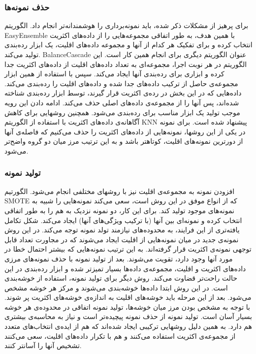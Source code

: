 \documentclass{article}
\begin{document}
\subsubsection{حذف نمونه‌ها}
برای پرهیز از مشکلات ذکر شده، باید نمونه‌برداری را هوشمندانه‌تر انجام داد. الگوریتم EasyEnsemble با همین هدف، به طور اتفاقی مجموعه‌هایی را از داده‌های اکثریت انتخاب کرده و برای تفکیک هر کدام از آنها و مجموعه داده‌های اقلیت، یک ابزار رده‌بندی تولید می‌کند. BalanceCascade عنوان الگوریتم دیگری برای انجام همین کار است. این الگوریتم در هر نوبت اجرا، مجموعه‌ای به تعداد داده‌های اقلیت از داده‌های اکثریت جدا کرده و ابزاری برای رده‌بندی آنها ایجاد می‌کند. سپس با استفاده از همین ابزار مجموعه‌ی حاصل از ترکیب داده‌های جدا شده و داده‌های اقلیت را رده‌بندی می‌کند. داده‌هایی که در این بخش در رده‌ی اکثریت قرار گیرند، توسط ابزار رده‌بندی شناخته شده‌اند، پس آنها را از مجموعه‌ی داده‌های اصلی حذف می‌کند. ادامه دادن این رویه موجب تولید یک ابزار مناسب برای رده‌بندی می‌شود.
همچنین روشهایی برای کاهش آگاهانه‌ی داده‌های اکثریت با استفاده از الگوریتم KNN پیشنهاد شده است. برای نمونه در یکی از این روشها، نمونه‌هایی از داده‌های اکثریت را حذف می‌کنیم که فاصله‌ی آنها از دورترین نمونه‌های اقلیت، کوتاهتر باشد و به این ترتیب مرز میان دو گروه واضح‌تر می‌شود.

\subsubsection{تولید نمونه}
افزودن نمونه به مجموعه‌ی اقلیت نیز با روشهای مختلفی انجام می‌شود. الگورتیم SMOTE که از انواع موفق در این روش است، سعی می‌کند نمونه‌هایی را شبیه به نمونه‌های موجود تولید کند. برای این کار، دو نمونه نزدیک به هم را به طور اتفاقی انتخاب کرده و نمونه‌ای بین آنها (با ترکیب ویژگی‌های آنها) ایجاد می‌کند.
شکل تکامل یافته‌تری از این فرایند، به محدوده‌های نیازمند تولد نمونه توجه می‌کند. در این روش نمونه‌ی جدید در میان نمونه‌هایی از اقلیت ایجاد می‌شوند که در مجاورت تعداد قابل توجهی نمونه‌ی اکثریت قرار گرفته‌اند. به این ترتیب نمونه‌هایی که بیشتر احتمال خطا در مورد آنها وجود دارد، تقویت می‌شوند. بعد از تولید نمونه با حذف نمونه‌های مرزی داده‌های اکثریت و اقلیت، مجموعه‌ی داده‌ها بسیار تمیزتر شده و ابزار رده‌بندی در این حالت راحت‌تر قضاوت می‌کند.
روش دیگر برای تولید نمونه، استفاده از خوشه‌بندی است. در این روش ابتدا داده‌ها خوشه‌بندی می‌شوند و مرکز هر خوشه مشخص می‌شود. بعد از این مرحله باید خوشه‌های اقلیت به اندازه‌ی خوشه‌های اکثریت پر شوند. با توجه به مشخص بودن مرز میان خوشه‌ها، تولید نمونه اتفاقی در محدوده‌ی هر خوشه بسیار آسان است.
تولید نمونه از حذف نمونه پیچیده‌تر است و نیاز به محاسبه‌ی بیشتری هم دارد. به همین دلیل روشهایی ترکیبی ایجاد شده‌اند که هم از ایده‌ی انتخاب‌های متعدد از مجموعه‌ی اکثریت استفاده می‌کنند و هم با تکرار داده‌های اقلیت، سعی می‌کنند تشخیص آنها را آسانتر کنند.
\end{document}
